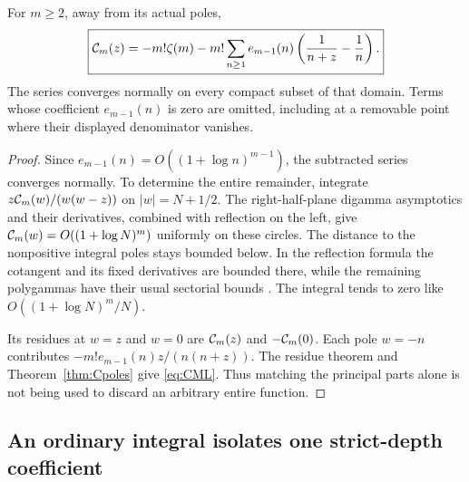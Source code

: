 \begin{theorem}
\label{thm:CML}
For $m\ge2$, away from its actual poles,
\begin{equation}\label{eq:CML}
 \boxed{\displaystyle
 \mathcal C_m(z)=-m!\zeta(m)-m!\sum_{n\ge1}e_{m-1}(n)
       \left(\frac1{n+z}-\frac1n\right).}
\end{equation}
The series converges normally on every compact subset of that domain.
Terms whose coefficient $e_{m-1}(n)$ is zero are omitted, including
at a removable point where their displayed denominator vanishes.
\end{theorem}
\begin{proof}
Since $e_{m-1}(n)=O((1+\log n)^{m-1})$, the subtracted series
converges normally. To determine the entire remainder, integrate
$z\mathcal C_m(w)/(w(w-z))$ on $|w|=N+1/2$. The right-half-plane
digamma asymptotics and their derivatives, combined with reflection
on the left, give $\mathcal C_m(w)=O((1+\log N)^m)$ uniformly on these
circles. The distance to the nonpositive integral poles stays bounded
below. In the reflection formula the cotangent and its fixed
derivatives are bounded there, while the remaining polygammas have
their usual sectorial bounds \cite{DLMF}. The integral tends to zero
like $O((1+\log N)^m/N)$.

Its residues at $w=z$ and $w=0$ are $\mathcal C_m(z)$ and
$-\mathcal C_m(0)$. Each pole $w=-n$ contributes
$-m!e_{m-1}(n)z/(n(n+z))$. The residue theorem and
Theorem~\ref{thm:Cpoles} give \eqref{eq:CML}. Thus matching the
principal parts alone is not being used to discard an arbitrary
entire function.
\end{proof}

\subsection{An ordinary integral isolates one strict-depth coefficient}

